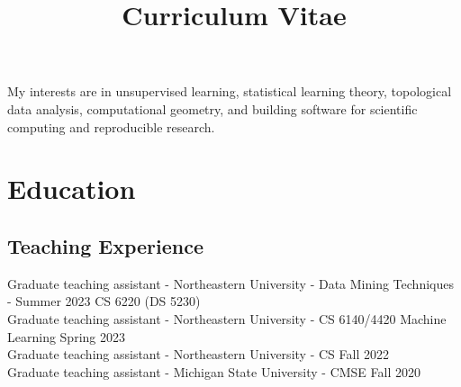 \documentclass[11pt,a4paper,sans]{moderncv} %
\title{Curriculum Vitae}
\begin{document}


%
%
%
%
%


\makecvtitle %

My interests are in unsupervised learning, statistical learning theory, topological data analysis, computational geometry, and building software for scientific computing and reproducible research.  
\section{Education}

\subsection{Teaching Experience}
Graduate teaching assistant - Northeastern University - Data Mining Techniques - Summer 2023 CS 6220 (DS 5230)  \\
Graduate teaching assistant - Northeastern University - CS 6140/4420 Machine Learning Spring 2023 \\
Graduate teaching assistant - Northeastern University - CS Fall 2022 \\
Graduate teaching assistant - Michigan State University - CMSE Fall 2020
\end{document}
